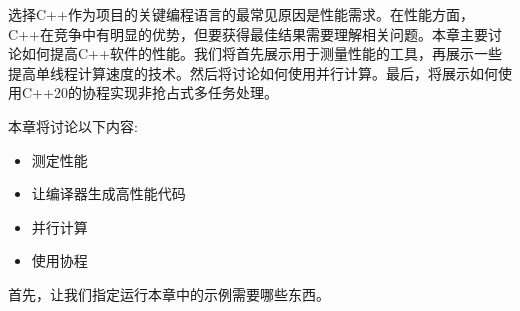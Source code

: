 
选择C++作为项目的关键编程语言的最常见原因是性能需求。在性能方面，C++在竞争中有明显的优势，但要获得最佳结果需要理解相关问题。本章主要讨论如何提高C++软件的性能。我们将首先展示用于测量性能的工具，再展示一些提高单线程计算速度的技术。然后将讨论如何使用并行计算。最后，将展示如何使用C++20的协程实现非抢占式多任务处理。

本章将讨论以下内容:

\begin{itemize}
\item 
测定性能

\item 
让编译器生成高性能代码

\item 
并行计算

\item 
使用协程
\end{itemize}

首先，让我们指定运行本章中的示例需要哪些东西。


